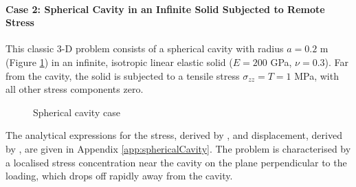 \documentclass[sn-mathphys,Numbered]{sn-jnl}%
\begin{document}
\paragraph{Case 2: Spherical Cavity in an Infinite Solid Subjected to Remote Stress}
This classic 3-D problem consists of a spherical cavity with radius $a = 0.2$ m (Figure \ref{fig:spherical_cavity}) in an infinite, isotropic linear elastic solid ($E = 200$ GPa, $\nu = 0.3$).
Far from the cavity, the solid is subjected to a tensile stress $\sigma_{zz} = T = 1$ MPa, with all other stress components zero.
\begin{figure}[htbp]
   \centering
   \caption{Spherical cavity case}
   \label{fig:spherical_cavity}
\end{figure}
The analytical expressions for the stress, derived by \citet{Southwell1926},  and displacement, derived by \citet{Goodier1933}, are given in Appendix \ref{app:sphericalCavity}.
The problem is characterised by a localised stress concentration near the cavity on the plane perpendicular to the loading, which drops off rapidly away from the cavity.
\end{document}
